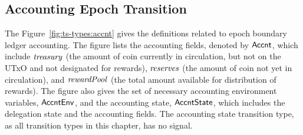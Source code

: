 \subsection{Accounting Epoch Transition}
\label{sec:acc-trans}

The Figure~\ref{fig:ts-types:accnt} gives the definitions related to epoch
boundary ledger accounting. The figure lists the accounting fields, denoted by
$\mathsf{Accnt}$, which include $\mathit{treasury}$ (the amount of coin currently in
circulation, but not on the UTxO and not designated for rewards),
$\mathit{reserves}$ (the amount of coin
not yet in circulation),
and $\mathit{rewardPool}$ (the total amount available for distribution of rewards).
The figure also gives the set of necessary accounting environment
variables, $\mathsf{AccntEnv}$, and the accounting state, $\mathsf{AccntState}$, which includes
the delegation state and the accounting fields. The accounting state transition
type, as all transition types in this chapter, has no signal.

